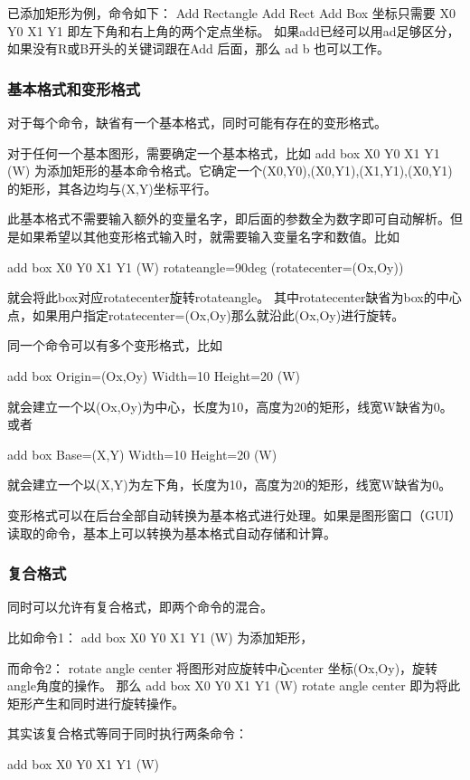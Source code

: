 已添加矩形为例，命令如下：
Add Rectangle
Add Rect
Add Box
坐标只需要
X0 Y0 X1 Y1 
即左下角和右上角的两个定点坐标。
如果add已经可以用ad足够区分，如果没有R或B开头的关键词跟在Add 后面，那么
ad b
也可以工作。

\subsubsection{基本格式和变形格式} \label{SectCmdForms} 
对于每个命令，缺省有一个基本格式，同时可能有存在的变形格式。

对于任何一个基本图形，需要确定一个基本格式，比如
add box X0 Y0 X1 Y1 (W)
为添加矩形的基本命令格式。它确定一个(X0,Y0),(X0,Y1),(X1,Y1),(X0,Y1)的矩形，其各边均与(X,Y)坐标平行。

此基本格式不需要输入额外的变量名字，即后面的参数全为数字即可自动解析。但是如果希望以其他变形格式输入时，就需要输入变量名字和数值。比如

add box X0 Y0 X1 Y1 (W) rotateangle=90deg (rotatecenter=(Ox,Oy))

就会将此box对应rotatecenter旋转rotateangle。
其中rotatecenter缺省为box的中心点，如果用户指定rotatecenter=(Ox,Oy)那么就沿此(Ox,Oy)进行旋转。

同一个命令可以有多个变形格式，比如

add box Origin=(Ox,Oy) Width=10 Height=20 (W)

就会建立一个以(Ox,Oy)为中心，长度为10，高度为20的矩形，线宽W缺省为0。
或者

add box Base=(X,Y) Width=10 Height=20 (W)

就会建立一个以(X,Y)为左下角，长度为10，高度为20的矩形，线宽W缺省为0。

变形格式可以在后台全部自动转换为基本格式进行处理。如果是图形窗口（GUI）读取的命令，基本上可以转换为基本格式自动存储和计算。

\subsubsection{复合格式} \label{SectCmdCmb} 
同时可以允许有复合格式，即两个命令的混合。

比如命令1：
add box X0 Y0 X1 Y1 (W) 为添加矩形，

而命令2：
rotate angle center
将图形对应旋转中心center 坐标(Ox,Oy)，旋转angle角度的操作。
那么
add box X0 Y0 X1 Y1 (W) rotate angle center
即为将此矩形产生和同时进行旋转操作。

其实该复合格式等同于同时执行两条命令：

add box X0 Y0 X1 Y1 (W)

